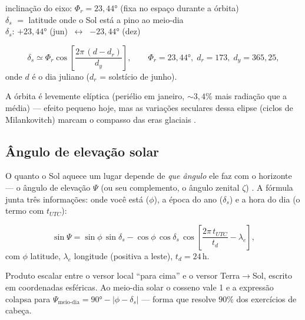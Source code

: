 \documentclass[11pt]{article}
\begin{document}
\begin{noquadro}
inclinação do eixo: $\Phi_r = 23{,}44°$ (fixa no espaço durante a órbita)\\
$\delta_s$ $=$ latitude onde o Sol está a pino ao meio-dia\\
$\delta_s$: $+23{,}44°$ (jun) $\ \longleftrightarrow\ $ $-23{,}44°$ (dez)
\end{noquadro}

\begin{formalivro}
\[ \delta_s \simeq \Phi_r \cos\!\left[\frac{2\pi\,(d-d_r)}{d_y}\right],
\qquad \Phi_r = 23{,}44°,\; d_r = 173,\; d_y = 365{,}25, \]
onde $d$ é o dia juliano ($d_r$ = solstício de junho).
\end{formalivro}

A órbita é levemente elíptica (periélio em janeiro, $\sim 3{,}4\%$ mais
radiação que a média) — efeito pequeno hoje, mas as variações seculares
dessa elipse (ciclos de Milankovitch) marcam o compasso das eras glaciais
.

\subsection{Ângulo de elevação solar}

O quanto o Sol aquece um lugar depende de \emph{que ângulo} ele faz com o
horizonte — o ângulo de elevação $\Psi$ (ou seu complemento, o ângulo
zenital $\zeta$) . A fórmula junta três
informações: onde você está ($\phi$), a época do ano ($\delta_s$) e a hora
do dia (o termo com $t_{UTC}$):

\begin{formalivro}
\[ \sin\Psi = \sin\phi\,\sin\delta_s
 - \cos\phi\,\cos\delta_s\,
   \cos\!\left[\frac{2\pi\, t_{UTC}}{t_d} - \lambda_e\right], \]
com $\phi$ latitude, $\lambda_e$ longitude (positiva a leste), $t_d = 24$\,h.
\end{formalivro}

\begin{formadif}
Produto escalar entre o versor local ``para cima'' e o versor
Terra$\to$Sol, escrito em coordenadas esféricas. Ao meio-dia solar o
cosseno vale 1 e a expressão colapsa para
$\Psi_{\text{meio-dia}} = 90° - |\phi - \delta_s|$ — forma que resolve
$90\%$ dos exercícios de cabeça.
\end{formadif}

\end{document}
